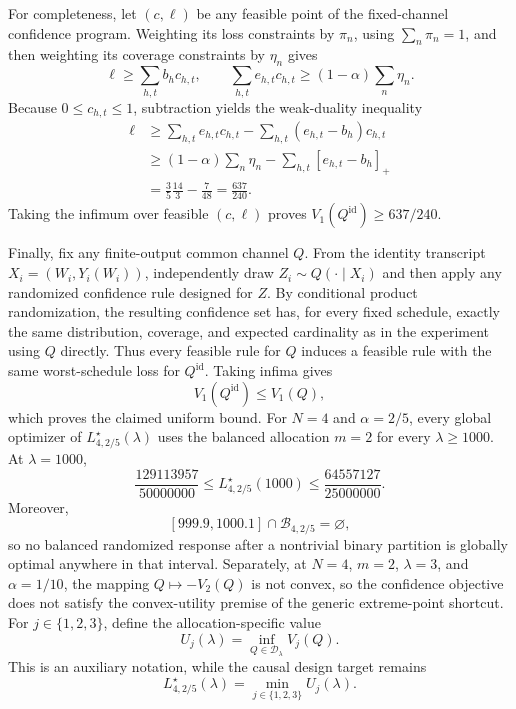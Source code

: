 For completeness, let \((c,\ell)\) be any feasible point of the fixed-channel confidence program. Weighting its loss constraints by \(\pi_n\), using \(\sum_n\pi_n=1\), and then weighting its coverage constraints by \(\eta_n\) gives
\[
 \ell\ge \sum_{h,t}b_hc_{h,t},
 \qquad
 \sum_{h,t}e_{h,t}c_{h,t}
 \ge (1-\alpha)\sum_n\eta_n.
\]
Because \(0\le c_{h,t}\le1\), subtraction yields the weak-duality inequality
\[
\begin{aligned}
 \ell
 &\ge \sum_{h,t}e_{h,t}c_{h,t}
      -\sum_{h,t}(e_{h,t}-b_h)c_{h,t}\\
 &\ge (1-\alpha)\sum_n\eta_n
      -\sum_{h,t}[e_{h,t}-b_h]_+\\
 &=\frac35\frac{14}{3}-\frac7{48}
 =\frac{637}{240}.
\end{aligned}
\]
Taking the infimum over feasible \((c,\ell)\) proves \(V_1(Q^{\mathrm{id}})\ge637/240\).

Finally, fix any finite-output common channel \(Q\). From the identity transcript \(X_i=(W_i,Y_i(W_i))\), independently draw \(Z_i\sim Q(\cdot\mid X_i)\) and then apply any randomized confidence rule designed for \(Z\). By conditional product randomization, the resulting confidence set has, for every fixed schedule, exactly the same distribution, coverage, and expected cardinality as in the experiment using \(Q\) directly. Thus every feasible rule for \(Q\) induces a feasible rule with the same worst-schedule loss for \(Q^{\mathrm{id}}\). Taking infima gives
\[
 V_1(Q^{\mathrm{id}})\le V_1(Q),
\]
which proves the claimed uniform bound.
For \(N=4\) and \(\alpha=2/5\), every global optimizer of \(L^\star_{4,2/5}(\lambda)\) uses the balanced allocation \(m=2\) for every \(\lambda\ge1000\). At \(\lambda=1000\),
\[
 \frac{129113957}{50000000}
 \le L^\star_{4,2/5}(1000)
 \le \frac{64557127}{25000000}.
\]
Moreover,
\[
 [999.9,1000.1]\cap\mathcal B_{4,2/5}=\varnothing,
\]
so no balanced randomized response after a nontrivial binary partition is globally optimal anywhere in that interval. Separately, at \(N=4\), \(m=2\), \(\lambda=3\), and \(\alpha=1/10\), the mapping \(Q\mapsto-V_2(Q)\) is not convex, so the confidence objective does not satisfy the convex-utility premise of the generic extreme-point shortcut.
For \(j\in\{1,2,3\}\), define the allocation-specific value
\[
 U_j(\lambda)=\inf_{Q\in\mathcal D_\lambda}V_j(Q).
\]
This is an auxiliary notation, while the causal design target remains
\[
 L^\star_{4,2/5}(\lambda)=\min_{j\in\{1,2,3\}}U_j(\lambda).
\]

